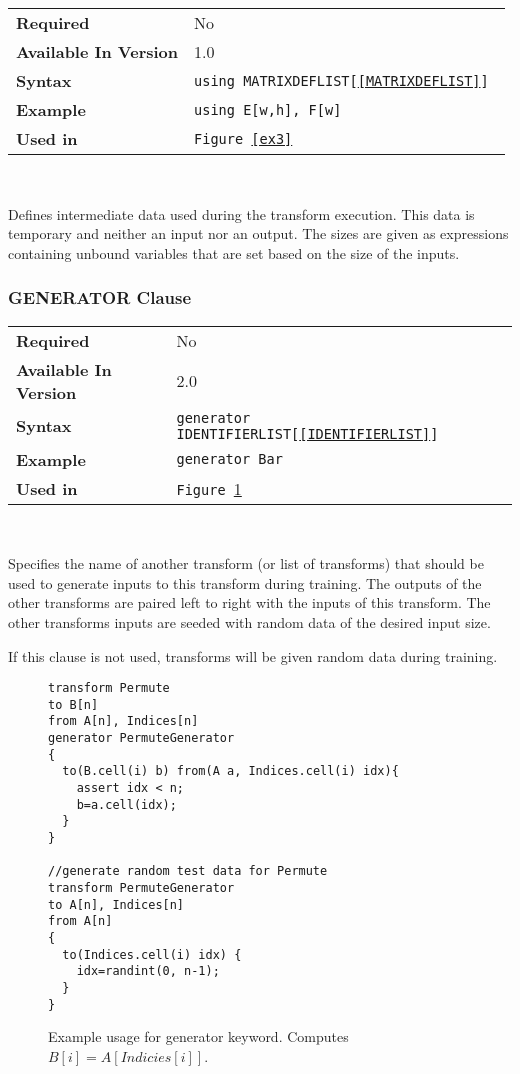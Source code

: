 \documentclass[11pt]{article}
\begin{document}
\begin{tabular}{| l | l |}
\hline
\bf Required & No                          \\
\bf Available In Version & 1.0             \\
\bf Syntax & \tt using MATRIXDEFLIST[\ref{MATRIXDEFLIST}]     \\
\bf Example & \tt using E[w,h], F[w]     \\
\bf Used in & \tt Figure~\ref{ex3}      \\
\hline
\end{tabular}

~

\noindent Defines intermediate data used during the transform execution. This
data is temporary and neither an input nor an output.  The sizes are given
as expressions containing unbound variables that are set based on the size
of the inputs.

\subsubsection{GENERATOR Clause}


\begin{tabular}{| l | l |}
\hline
\bf Required & No \\
\bf Available In Version & 2.0            \\
\bf Syntax & \tt generator IDENTIFIERLIST[\ref{IDENTIFIERLIST}]\\
\bf Example & \tt generator Bar\\
\bf Used in & \tt Figure~\ref{ex4}      \\
\hline
\end{tabular}

~

\noindent Specifies the name of another transform (or list of transforms)
that should be used to generate inputs to this transform during training.
The outputs of the other transforms are paired left to right with the inputs
of this transform.  The other transforms inputs are seeded with random data
of the desired input size.

If this clause is not used, transforms will be given random data during
training.

\begin{figure}[h]
\begin{lstlisting}
transform Permute
to B[n]
from A[n], Indices[n]
generator PermuteGenerator
{
  to(B.cell(i) b) from(A a, Indices.cell(i) idx){
    assert idx < n;
    b=a.cell(idx);
  }
}

//generate random test data for Permute
transform PermuteGenerator 
to A[n], Indices[n]
from A[n]
{
  to(Indices.cell(i) idx) {
    idx=randint(0, n-1);
  }
}
\end{lstlisting}
  \caption{
  Example usage for generator keyword.  Computes $B[i]=A[Indicies[i]]$.
  \label{ex4}
  }
\end{figure}
\end{document}
